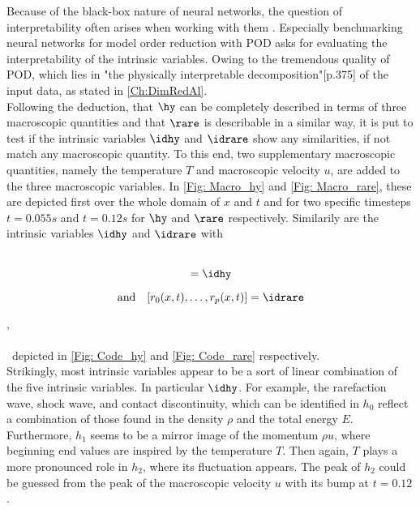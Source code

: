 Because of the black-box nature of neural networks, the question of interpretability often arises when working with them \cite{fan2021interpretability}. Especially benchmarking neural networks for model order reduction with POD asks for evaluating the interpretability of the intrinsic variables. Owing to the tremendous quality of POD, which lies in "the physically interpretable decomposition"\cite{Kutz}[p.375] of the input data, as stated in \cref{Ch:DimRedAl}.\\
Following the deduction, that \(\hy\) can be completely described in terms of three macroscopic quantities and that \(\rare\) is describable in a similar way, it is put to test if the intrinsic variables \(\idhy\) and \(\idrare\) show any similarities, if not match any macroscopic quantity. To this end, two supplementary macroscopic quantities, namely the temperature \(T\) and macroscopic velocity \(u\), are added to the three macroscopic variables. In \cref{Fig: Macro_hy} and \cref{Fig: Macro_rare}, these are depicted first over the whole domain of \(x\) and \(t\) and for two specific timesteps \(t=0.055s\) and \(t=0.12s\) for \(\hy\) and \(\rare\) respectively. Similarily are the intrinsic variables \(\idhy\) and \(\idrare\) with\\\\
\begin{minipage}{0.45\textwidth}
	\begin{equation}
		[h_0(x,t),\dots,h_p(x,t)] = \idhy
	\end{equation}
\end{minipage}%
\begin{minipage}{0.45\textwidth}
	\begin{equation}
		\mathrm{and}\quad[r_0(x,t),\dots,r_p(x,t)] = \idrare
	\end{equation}
\end{minipage},\\\\\
depicted in \cref{Fig: Code_hy} and \cref{Fig: Code_rare} respectively.\\
Strikingly, most intrinsic variables appear to be a sort of linear combination of the five intrinsic variables. In particular \(\idhy\). For example, the rarefaction wave, shock wave, and contact discontinuity, which can be identified in \(h_0\) reflect a combination of those found in the density \(\rho\) and the total energy \(E\). Furthermore, \(h_1\) seems to be a mirror image of the momentum \(\rho u\), where beginning end values are inspired by the temperature \(T\). Then again, \(T\) plays a more pronounced role in \(h_2\), where its fluctuation appears. The peak of \(h_2\) could be guessed from the peak of the macroscopic velocity \(u\) with its bump at \(t=0.12\).\\
